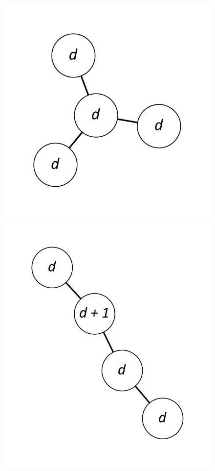 \documentclass[12pt]{article}
\theoremstyle{plain}
\theoremstyle{definition}
\theoremstyle{remark}
\begin{document}
\begin{figure}[!htb]
\centering
\includegraphics[scale=0.25]{Superabundance/all/001011[1,1,1,3].pdf}
\includegraphics[scale=0.25]{Superabundance/all/011010[2,1,1,3].pdf}

\end{figure}
\end{document}
